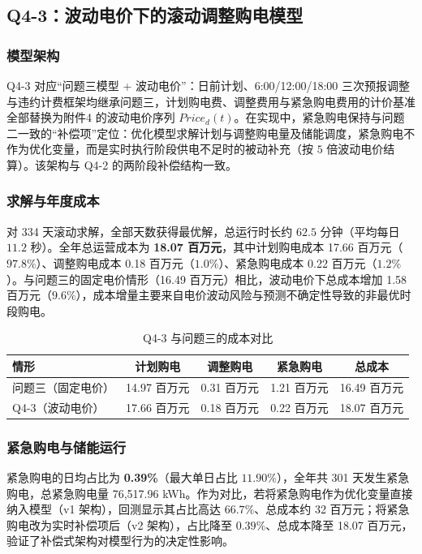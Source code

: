 \documentclass[zihao=-4,a4paper,UTF8,fontset=none]{ctexart}
\begin{document}
\subsection{Q4-3：波动电价下的滚动调整购电模型}

\subsubsection{模型架构}

Q4-3 对应“问题三模型 + 波动电价”：日前计划、6:00/12:00/18:00 三次预报调整与违约计费框架均继承问题三，计划购电费、调整费用与紧急购电费用的计价基准全部替换为附件4 的波动电价序列 $Price_d(t)$。在实现中，紧急购电保持与问题二一致的“补偿项”定位：优化模型求解计划与调整购电量及储能调度，紧急购电不作为优化变量，而是实时执行阶段供电不足时的被动补充（按 $5$ 倍波动电价结算）。该架构与 Q4-2 的两阶段补偿结构一致。

\subsubsection{求解与年度成本}

对 334 天滚动求解，全部天数获得最优解，总运行时长约 $62.5$ 分钟（平均每日 $11.2$ 秒）。全年总运营成本为 \textbf{18.07 百万元}，其中计划购电成本 17.66 百万元（$97.8\%$）、调整购电成本 0.18 百万元（$1.0\%$）、紧急购电成本 0.22 百万元（$1.2\%$）。与问题三的固定电价情形（16.49 百万元）相比，波动电价下总成本增加 1.58 百万元（$9.6\%$），成本增量主要来自电价波动风险与预测不确定性导致的非最优时段购电。

\begin{table}[H]
  \centering
  \caption{Q4-3 与问题三的成本对比}
  \label{tab:q43_vs_q3}
  \small
  \begin{tabular}{lcccc}
    \toprule
    情形 & 计划购电 & 调整购电 & 紧急购电 & 总成本 \\
    \midrule
    问题三（固定电价） & 14.97 百万元 & 0.31 百万元 & 1.21 百万元 & 16.49 百万元 \\
    Q4-3（波动电价） & 17.66 百万元 & 0.18 百万元 & 0.22 百万元 & 18.07 百万元 \\
    \bottomrule
  \end{tabular}
\end{table}

\subsubsection{紧急购电与储能运行}

紧急购电的日均占比为 \textbf{0.39\%}（最大单日占比 $11.90\%$），全年共 301 天发生紧急购电，总紧急购电量 76{,}517.96 kWh。作为对比，若将紧急购电作为优化变量直接纳入模型（v1 架构），回测显示其占比高达 $66.7\%$、总成本约 32 百万元；将紧急购电改为实时补偿项后（v2 架构），占比降至 $0.39\%$、总成本降至 18.07 百万元，验证了补偿式架构对模型行为的决定性影响。
\end{document}
